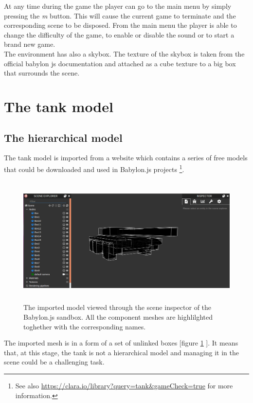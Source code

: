 \documentclass[14pt]{article}
\begin{document}
At any time during the game the player can go to the main menu by simply pressing the \textit{m} button. This will cause the current game to terminate and the corresponding scene to be disposed. From the main menu the player is able to change the difficulty of the game, to enable or disable the sound or to start a brand new game.\\
The environment has also a skybox. The texture of the skybox is taken from the official babylon js documentation and attached as a cube texture to a big box that surrounds the scene.

\section{The tank model}
\subsection{The hierarchical model}
The tank model is imported from a website which contains a series of free models that could be downloaded and used in Babylon.js projects \footnote{See also \url{https://clara.io/library?query=tank&gameCheck=true} for more information.}. 

\begin{figure}[H]
\center
\includegraphics[width=12cm, height= 6.5cm]{images/model_sandbox.png}
\caption{The imported model viewed through the scene inspector of the Babylon.js sandbox. All the component meshes are highlilghted toghether with the corresponding names.}
\label{img:modelSandbox}
\end{figure}


The imported mesh is in a form of a set of unlinked boxes [figure \ref{img:modelSandbox} ]. It means that, at this stage, the tank is not a hierarchical model and managing it in the scene could be a challenging task.\\
\end{document}
